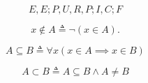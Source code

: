 \begin{frame}{}
  \[
    E, E; P, U, R, P; I, C; F
  \]
\end{frame}

\begin{frame}{}
  \begin{definition}[$\notin$]
    \[
      x \notin A \triangleq \lnot (x \in A).
    \]
  \end{definition}

  \pause
  \begin{definition}[$\subseteq, \subset$]
    \[
      A \subseteq B \triangleq \forall x (x \in A \implies x \in B)
    \]

    \[
      A \subset B \triangleq A \subseteq B \land A \neq B
    \]
  \end{definition}
\end{frame}

% 

% 
% 
